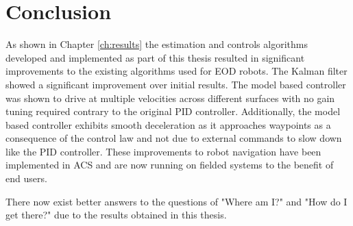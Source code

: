 \chapter{Conclusion}
\label{ch:conclusion}
As shown in Chapter \ref{ch:results} the estimation and controls algorithms developed and implemented as part of this thesis resulted in significant improvements to the existing algorithms used for EOD robots. The Kalman filter showed a significant improvement over initial results. The model based controller was shown to drive at multiple velocities across different surfaces with no gain tuning required contrary to the original PID controller. Additionally, the model based controller exhibits smooth deceleration as it approaches waypoints as a consequence of the control law and not due to external commands to slow down like the PID controller. These improvements to robot navigation have been implemented in ACS and are now running on fielded systems to the benefit of end users.

There now exist better answers to the questions of "Where am I?" and "How do I get there?" due to the results obtained in this thesis.
